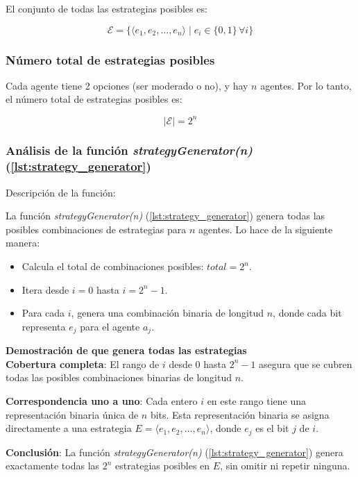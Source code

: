 \documentclass[letterpaper,10pt]{article}
\begin{document}
El conjunto de todas las estrategias posibles es:

\[
\mathcal{E} = \{\langle e_1, e_2, \dots, e_n \rangle \mid e_i \in \{0, 1\} \, \forall i\}
\]

\subsubsection*{Número total de estrategias posibles}

Cada agente tiene 2 opciones (ser moderado o no), y hay $n$ agentes. Por lo tanto, el número total de estrategias posibles es:

\[
|\mathcal{E}| = 2^n
\]

\subsubsection*{Análisis de la función \textit{strategyGenerator(n)} (\ref{lst:strategy_generator})}

Descripción de la función:

La función \textit{strategyGenerator(n)} (\ref{lst:strategy_generator}) genera todas las posibles combinaciones de estrategias para $n$ agentes. Lo hace de la siguiente manera:

\begin{itemize}
    \item Calcula el total de combinaciones posibles: $total = 2^n$.
    \item Itera desde $i = 0$ hasta $i = 2^n - 1$.
    \item Para cada $i$, genera una combinación binaria de longitud $n$, donde cada bit representa $e_j$ para el agente $a_j$.
\end{itemize}

\textbf{Demostración de que genera todas las estrategias}
\\

\textbf{Cobertura completa}: El rango de $i$ desde $0$ hasta $2^n - 1$ asegura que se cubren todas las posibles combinaciones binarias de longitud $n$.

\textbf{Correspondencia uno a uno}: Cada entero $i$ en este rango tiene una representación binaria única de $n$ bits. Esta representación binaria se asigna directamente a una estrategia $E = \langle e_1, e_2, \dots, e_n \rangle$, donde $e_j$ es el bit $j$ de $i$.

\textbf{Conclusión}: La función \textit{strategyGenerator(n)} (\ref{lst:strategy_generator}) genera exactamente todas las $2^n$ estrategias posibles en $E$, sin omitir ni repetir ninguna.
\end{document}
